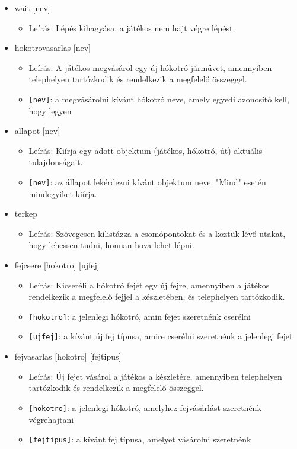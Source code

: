 \begin{itemize}
    \item wait [nev]
    \begin{itemize}
        \item Leírás: Lépés kihagyása, a játékos nem hajt végre lépést.
    \end{itemize}


    \item hokotrovasarlas [nev]
    \begin{itemize}
        \item Leírás: A játékos megvásárol egy új hókotró járművet, amennyiben telephelyen tartózkodik és rendelkezik a megfelelő összeggel.
        \item \texttt{[nev]}: a megvásárolni kívánt hókotró neve, amely egyedi azonosító kell, hogy legyen
    \end{itemize}

    \item allapot [nev]
    \begin{itemize}
        \item Leírás: Kiírja egy adott objektum (játékos, hókotró, út) aktuális tulajdonságait.
        \item \texttt{[nev]}: az állapot lekérdezni kívánt objektum neve. "Mind" esetén mindegyiket kiírja. 
    \end{itemize}
    
    \item terkep
    \begin{itemize}
        \item Leírás: Szövegesen kilistázza a csomópontokat és a köztük lévő utakat, hogy lehessen tudni, honnan hova lehet lépni.
    \end{itemize}
    
    \item fejcsere [hokotro] [ujfej]
    \begin{itemize}
        \item Leírás: Kicseréli a hókotró fejét egy új fejre, amennyiben a játékos rendelkezik a megfelelő fejjel a készletében, és telephelyen tartózkodik.
        \item \texttt{[hokotro]}: a jelenlegi hókotró, amin fejet szeretnénk cserélni
        \item \texttt{[ujfej]}: a kívánt új fej típusa, amire cserélni szeretnénk a jelenlegi fejet
    \end{itemize}

    \item fejvasarlas [hokotro] [fejtipus]
    \begin{itemize}
        \item Leírás: Új fejet vásárol a játékos a készletére, amennyiben telephelyen tartózkodik és rendelkezik a megfelelő összeggel.
        \item \texttt{[hokotro]}: a jelenlegi hókotró, amelyhez fejvásárlást szeretnénk végrehajtani
        \item \texttt{[fejtipus]}: a kívánt fej típusa, amelyet vásárolni szeretnénk
    \end{itemize}


\end{itemize}
